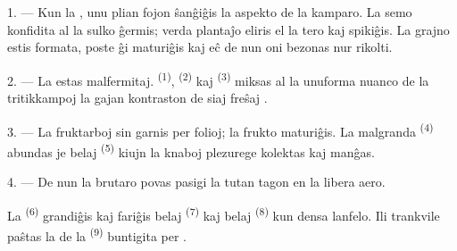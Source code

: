 %
%


\VUsaut{5.0mm}
\VUsaut{3.0mm}
\VUsaut{3.0mm}
\VUsaut{4.0mm}
\VUsaut{3.0mm}

1. --- Kun la , unu plian fojon ŝanĝiĝis la aspekto de la
kamparo. La semo konfidita al la sulko ĝermis; verda plantaĵo eliris el la tero
kaj spikiĝis. La grajno estis formata, poste ĝi maturiĝis kaj eĉ de nun oni
bezonas nur rikolti.

2. --- La  estas malfermitaj. 
\textsuperscript{(1)},  \textsuperscript{(2)} kaj
 \textsuperscript{(3)} miksas al la unuforma nuanco de la
tritikkampoj la gajan kontraston de siaj freŝaj .

3. --- La fruktarboj sin garnis per folioj; la frukto maturiĝis. La malgranda
 \textsuperscript{(4)} abundas je belaj 
\textsuperscript{(5)} kiujn la knaboj plezurege kolektas kaj manĝas.

4. --- De nun la brutaro povas pasigi la tutan tagon en la libera aero.

La  \textsuperscript{(6)} grandiĝis kaj fariĝis belaj
 \textsuperscript{(7)} kaj belaj 
\textsuperscript{(8)} kun densa lanfelo. Ili trankvile paŝtas la 
de la  \textsuperscript{(9)} buntigita per .

